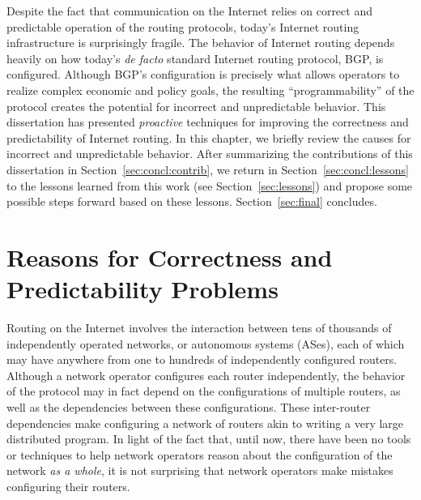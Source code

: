 
\label{chap:concl}

Despite the fact that communication on the Internet relies on correct
and predictable operation of the routing protocols, today's Internet
routing infrastructure is surprisingly fragile.  The behavior of
Internet routing depends heavily on how today's {\em de facto} standard
Internet routing protocol, BGP, is configured.  Although BGP's
configuration is precisely what allows operators to realize complex
economic and policy goals, the resulting ``programmability'' of the
protocol creates the potential for incorrect and unpredictable behavior.
This dissertation has presented {\em proactive} techniques for improving
the correctness and predictability of Internet routing.  In this
chapter, we briefly review the causes for incorrect and unpredictable
behavior.  After summarizing the contributions of this dissertation in
Section~\ref{sec:concl:contrib}, we return in
Section~\ref{sec:concl:lessons} to the lessons learned 
from this work (see Section~\ref{sec:lessons}) and
propose some possible steps forward based on these lessons.
Section~\ref{sec:final} concludes.

\section{Reasons for Correctness and Predictability Problems}

Routing on the Internet involves the interaction between tens of
thousands of independently operated networks, or autonomous systems
(ASes), each of which may have anywhere from one to hundreds of
independently configured routers.  Although a network operator
configures each router independently, the behavior of the protocol may in
fact depend on the configurations of multiple routers, as well as the
dependencies between these configurations.  These
inter-router dependencies make configuring a network of
routers akin to writing a very large distributed program.  In light of the
fact that, until now, there have been no tools or techniques to help
network operators reason about the configuration of the network {\em as
a whole}, it is not surprising that network operators make mistakes
configuring their routers.


